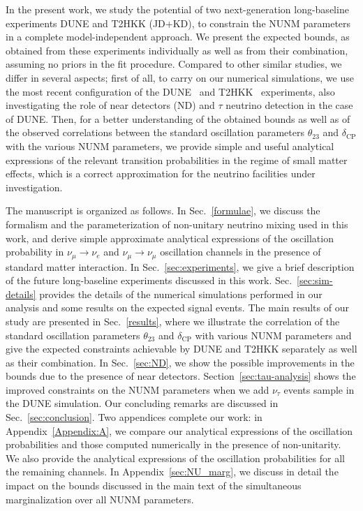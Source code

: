 \documentclass[11pt,a4paper]{article}
\begin{document}
In the present work, we study the potential of two next-generation long-baseline experiments DUNE and T2HKK (JD+KD), to constrain the NUNM parameters in a complete model-independent approach. We present the expected bounds, as obtained from these experiments individually as well as from their combination, assuming no priors in the fit procedure. 
Compared to other similar studies, we differ in several aspects; first of all, to carry on our numerical simulations, we use the most recent configuration of the DUNE~\cite{DUNE:2021cuw} and T2HKK~\cite{Hyper-Kamiokande:2016srs} experiments, also investigating the role of near detectors (ND) and $\tau$ neutrino detection in the case of DUNE. Then, for a better understanding of the obtained bounds as well as of the observed correlations between the standard oscillation parameters  $\theta_{23}$ and $\delta_{\mathrm{CP}}$ with the various NUNM parameters, we provide simple and useful analytical expressions of the relevant transition probabilities in the regime of small matter effects, which is a correct approximation for the neutrino facilities under investigation. 

 The manuscript is organized as follows. In Sec.~\ref{formulae}, we discuss the formalism and the parameterization of non-unitary neutrino mixing used in this work, and derive  simple approximate analytical expressions of the oscillation probability in $\nu_{\mu}\rightarrow\nu_{e}$ and $\nu_{\mu}\rightarrow\nu_{\mu}$ oscillation channels in the presence of standard matter interaction. In Sec.~\ref{sec:experiments}, we give a brief description of the future long-baseline experiments discussed in this work. Sec.~\ref{sec:sim-details} provides the details of the numerical simulations performed in our analysis and some results on the expected signal events. The main results of our study are presented in Sec.~\ref{results}, where we illustrate the correlation of the standard oscillation parameters $\theta_{23}$ and $\delta_{\mathrm{CP}}$ with various NUNM parameters and give the expected constraints achievable by DUNE and T2HKK separately as well as their combination. In Sec.~\ref{sec:ND}, we show the possible improvements in the bounds due to the presence of near detectors. 
 Section~\ref{sec:tau-analysis} shows the improved constraints on the NUNM parameters when we add $\nu_{\tau}$ events sample in the DUNE simulation. Our concluding remarks are discussed in Sec.~\ref{sec:conclusion}. Two appendices complete our work: in Appendix~\ref{Appendix:A}, we compare our analytical expressions of the oscillation probabilities and those computed numerically in the presence of non-unitarity. We also provide the analytical expressions of the  oscillation probabilities for all the remaining channels. In Appendix~\ref{sec:NU_marg}, we discuss in detail the impact on the bounds discussed in the main text of the simultaneous marginalization over all NUNM parameters.
	
\end{document}
